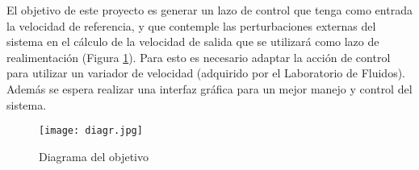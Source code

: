 El objetivo de este proyecto es generar un lazo de control que tenga como entrada la velocidad de referencia, y que contemple las perturbaciones externas del sistema en el cálculo de la velocidad de salida que se utilizará como lazo de realimentación (Figura \ref{fig:diagr}). 
Para esto es necesario adaptar la acción de control para utilizar un variador de velocidad (adquirido por el Laboratorio de Fluidos).
Además se espera realizar una interfaz gráfica para un mejor manejo y control del sistema.

\begin{figure}[htb]
	\centering
	\texttt{[image: diagr.jpg]}
	\caption{Diagrama del objetivo}
	\label{fig:diagr}
	\end{figure}


	\newpage